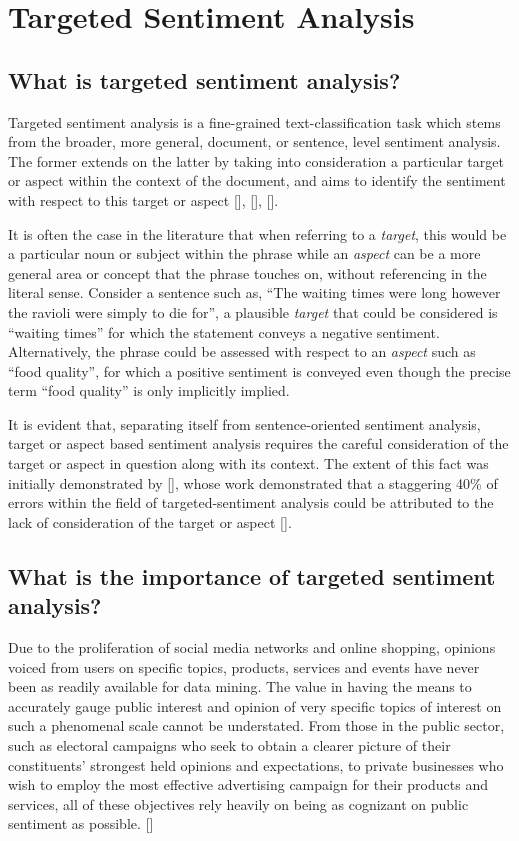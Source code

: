 \documentclass[12pt, a4paper]{report}
\theoremstyle{definition}
\theoremstyle{definition}%
\theoremstyle{definition}%
\theoremstyle{definition}%
\theoremstyle{definition}%
\theoremstyle{definition}%
\renewcommand{\cite}[1]{[\citealp{#1}]}
\begin{document}
\section{Targeted Sentiment Analysis}
\subsection{What is targeted sentiment analysis?}
Targeted sentiment analysis is a fine-grained text-classification task which stems from the broader, more general, document, or sentence, level sentiment analysis. The former extends on the latter by taking into consideration a particular target or aspect within the context of the document, and aims to identify the sentiment with respect to this target or aspect \cite{pang2008}, \cite{liu2012}, \cite{pontiki}.

It is often the case in the literature that when referring to a \textit{target}, this would be a particular noun or subject within the phrase while an \textit{aspect} can be a more general area or concept that the phrase touches on, without referencing in the literal sense. Consider a sentence such as, \enquote{The waiting times were long however the ravioli were simply to die for}, a plausible \textit{target} that could be considered is \enquote{waiting times} for which the statement conveys a negative sentiment. Alternatively, the phrase could be assessed with respect to an \textit{aspect} such as \enquote{food quality}, for which a positive sentiment is conveyed even though the precise term \enquote{food quality} is only implicitly implied. 

It is evident that, separating itself from sentence-oriented sentiment analysis, target or aspect based sentiment analysis requires the careful consideration of the target or aspect in question along with its context. The extent of this fact was initially demonstrated by \cite{jiang2011}, whose work demonstrated that a staggering 40\% of errors within the field of targeted-sentiment analysis could be attributed to the lack of consideration of the target or aspect \cite{jiang2011}.

\subsection{What is the importance of targeted sentiment analysis?}
Due to the proliferation of social media networks and online shopping, opinions voiced from users on specific topics, products, services and events have never been as readily available for data mining. The value in having the means to accurately gauge public interest and opinion of very specific topics of interest on such a phenomenal scale cannot be understated. From those in the public sector, such as electoral campaigns who seek to obtain a clearer picture of their constituents' strongest held opinions and expectations, to private businesses who wish to employ the most effective advertising campaign for their products and services, all of these objectives rely heavily on being as cognizant on public sentiment as possible. \cite{tang2016}
\end{document}
